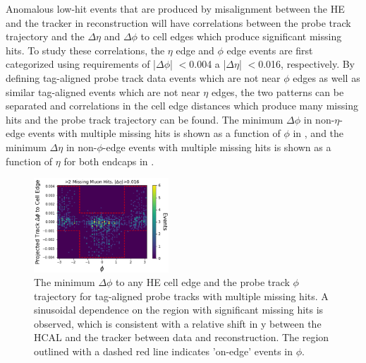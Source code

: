 Anomalous low-hit events that are produced by misalignment between the HE and the tracker in reconstruction will have correlations between the probe track trajectory and the $\Delta\eta$ and $\Delta\phi$ to cell edges which produce significant missing hits. 
To study these correlations, the $\eta$ edge and $\phi$ edge events are first categorized using requirements of |$\Delta\phi$| $<$0.004 a |$\Delta\eta$| $<$0.016, respectively. 
By defining tag-aligned probe track data events which are not near $\phi$ edges as well as similar tag-aligned events which are not near $\eta$ edges, the two patterns can be separated and correlations in the cell edge distances which produce many missing hits and the probe track trajectory can be found. 
The minimum $\Delta\phi$ in non-$\eta$-edge events with multiple missing hits is shown as a function of $\phi$ in , and the minimum $\Delta\eta$ in non-$\phi$-edge events with multiple missing hits is shown as a function of $\eta$ for both endcaps in .

\begin{figure}[htpb]
    \includegraphics[width=0.45\textwidth]{figures/phiEdgeEventsData.png} 
    \centering
	\caption[$\phi$ edge correlations in missing HCAL muon hits.]{The minimum $\Delta\phi$ to any HE cell edge and the probe track $\phi$ trajectory for tag-aligned probe tracks with multiple missing hits. A sinusoidal dependence on the region with significant missing hits is observed, which is consistent with a relative shift in y between the HCAL and the tracker between data and reconstruction. The region outlined with a dashed red line indicates 'on-edge' events in $\phi$.}
    \label{fig:phiEdgeCorr}
\end{figure}

